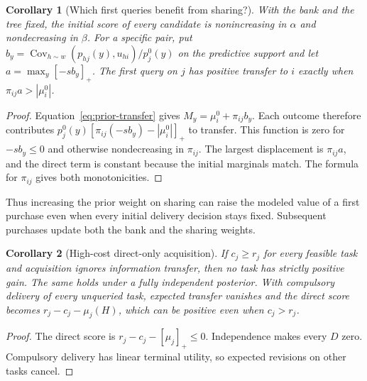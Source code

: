 \documentclass[journal]{IEEEtran}
\newtheorem{corollary}{Corollary}
\begin{document}
\begin{corollary}[Which first queries benefit from sharing?]\label{cor:initial}
With the bank and the tree fixed, the initial score of every candidate is nonincreasing in $\alpha$ and nondecreasing in $\beta$. For a specific pair, put $b_y=\operatorname{Cov}_{h\sim w}(p_{hj}(y),u_{hi})/p_j^0(y)$ on the predictive support and let $a=\max_y[-s b_y]_+$. The first query on $j$ has positive transfer to $i$ exactly when $\pi_{ij}a>|\mu_i^0|$.
\end{corollary}
\begin{proof}
Equation~\eqref{eq:prior-transfer} gives $M_y=\mu_i^0+\pi_{ij}b_y$. Each outcome therefore contributes $p_j^0(y)[\pi_{ij}(-s b_y)-|\mu_i^0|]_+$ to transfer. This function is zero for $-s b_y\le0$ and otherwise nondecreasing in $\pi_{ij}$. The largest displacement is $\pi_{ij}a$, and the direct term is constant because the initial marginals match. The formula for $\pi_{ij}$ gives both monotonicities.
\end{proof}
Thus increasing the prior weight on sharing can raise the modeled value of a first purchase even when every initial delivery decision stays fixed. Subsequent purchases update both the bank and the sharing weights.

\begin{corollary}[High-cost direct-only acquisition]\label{cor:cost}
If $c_j\ge r_j$ for every feasible task and acquisition ignores information transfer, then no task has strictly positive gain. The same holds under a fully independent posterior. With compulsory delivery of every unqueried task, expected transfer vanishes and the direct score becomes $r_j-c_j-\mu_j(H)$, which can be positive even when $c_j>r_j$.
\end{corollary}
\begin{proof}
The direct score is $r_j-c_j-[\mu_j]_+\le0$. Independence makes every $D$ zero. Compulsory delivery has linear terminal utility, so expected revisions on other tasks cancel.
\end{proof}
\end{document}

